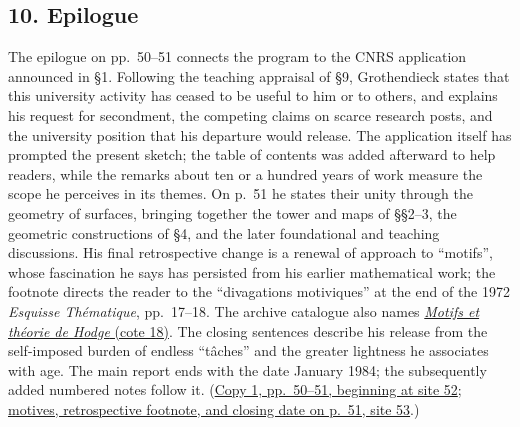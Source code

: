 \subsection*{10. Epilogue}
The epilogue on pp.~50--51 connects the program to the CNRS application
announced in \S1. Following the teaching appraisal of \S9, Grothendieck
states that this university activity has ceased to be useful to him or
to others, and explains his request for secondment, the competing claims
on scarce research posts, and the university position that his departure
would release. The application itself has prompted the present sketch;
the table of contents was added afterward to help readers, while the
remarks about ten or a hundred years of work measure the scope he
perceives in its themes. On p.~51 he states their unity through the
geometry of surfaces, bringing together the tower and maps of \S\S2--3,
the geometric constructions of \S4, and the later foundational and
teaching discussions. His final retrospective change is a renewal of
approach to ``motifs'', whose fascination he says has persisted from his
earlier mathematical work; the footnote directs the reader to the
``divagations motiviques'' at the end of the 1972 \emph{Esquisse
Thématique}, pp.~17--18. The archive catalogue also names
\href{https://grothendieck.umontpellier.fr/archives-grothendieck/}{\emph{Motifs et théorie de Hodge} (cote 18)}.
The closing sentences describe his release from the self-imposed burden
of endless ``tâches'' and the greater lightness he associates with age.
The main report ends with the date January 1984; the subsequently added
numbered notes follow it.
(\href{https://grothendieck.umontpellier.fr/web/viewer.html?file=../119.pdf\#page=53}{Copy 1, pp.~50--51, beginning at site 52};
\href{https://grothendieck.umontpellier.fr/web/viewer.html?file=../119.pdf\#page=54}{motives, retrospective footnote, and closing date on p.~51, site 53}.)
